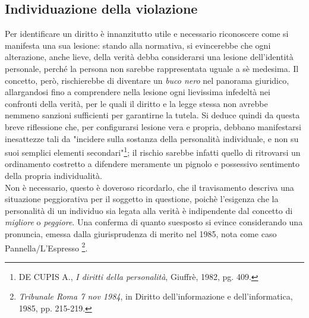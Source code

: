 \subsection{Individuazione della violazione}
Per identificare un diritto è innanzitutto utile e necessario riconoscere come si manifesta una sua lesione: stando alla normativa, si evincerebbe che ogni alterazione, anche lieve, della verità debba considerarsi una lesione dell'identità personale, perché la persona non sarebbe rappresentata uguale a sè medesima. Il concetto, però, rischierebbe di diventare un \textit{buco nero} nel panorama giuridico, allargandosi fino a comprendere nella lesione ogni lievissima infedeltà nei confronti della verità, per le quali il diritto e la legge stessa non avrebbe nemmeno sanzioni sufficienti per garantirne la tutela. Si deduce quindi da questa breve riflessione che, per configurarsi lesione vera e propria, debbano manifestarsi inesattezze tali da "incidere sulla sostanza della personalità individuale, e non su suoi semplici elementi secondari"\footnote{DE CUPIS A., \textit{I diritti della personalità}, Giuffrè, 1982, pg. 409.}; il rischio sarebbe infatti quello di ritrovarsi un ordinamento costretto a difendere meramente un pignolo e possessivo sentimento della propria individualità.
\\Non è necessario, questo è doveroso ricordarlo, che il travisamento descriva una situazione peggiorativa per il soggetto in questione, poichè l'esigenza che la personalità di un individuo sia legata alla verità è indipendente dal concetto di \textit{migliore} o \textit{peggiore}.
Una conferma di quanto suesposto si evince considerando una pronuncia, emessa dalla giurisprudenza di merito nel 1985, nota come caso Pannella/L'Espresso \footnote{\textit{Tribunale Roma 7 nov 1984}, in Diritto dell’informazione e dell’informatica, 1985, pp. 215-219.}.
